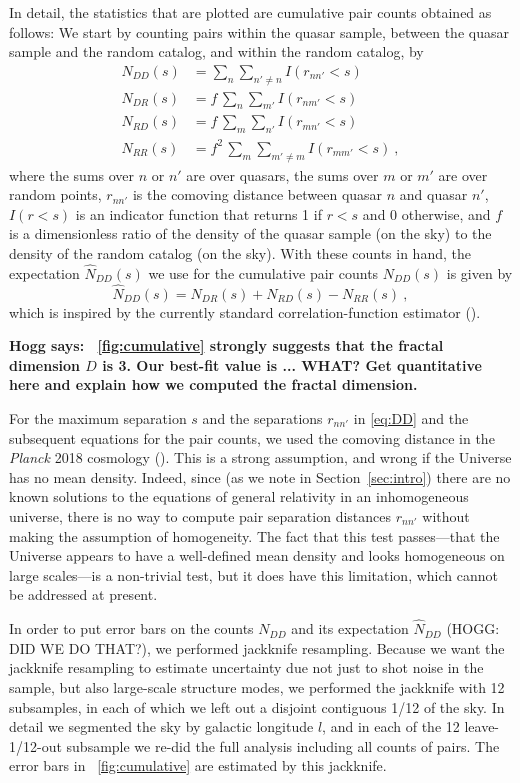 \documentclass[modern]{aastex631}
\newcommand{\sectionname}{Section}
\newcommand{\secref}[1]{\sectionname~\ref{#1}}
\newcommand{\figref}[1]{\figurename~\ref{#1}}
\newcommand{\hogg}[1]{\textbf{Hogg says: #1}}
\begin{document}
In detail, the statistics that are plotted are cumulative pair counts obtained as follows:
We start by counting pairs within the quasar sample, between the quasar sample and the random catalog, and within the random catalog, by
\begin{align}\label{eq:DD}
    N_{DD}(s) &= \sum_n \sum_{n'\ne n} I(r_{nn'} < s) \\
    N_{DR}(s) &= f\,\sum_n \sum_{m'} I(r_{nm'} < s) \\
    N_{RD}(s) &= f\,\sum_m \sum_{n'} I(r_{mn'} < s) \\
    N_{RR}(s) &= f^2\,\sum_m \sum_{m'\ne m} I(r_{mm'} < s)\label{eq:RR} ~,
\end{align}
where the sums over $n$ or $n'$ are over quasars,
the sums over $m$ or $m'$ are over random points,
$r_{nn'}$ is the comoving distance between quasar $n$ and quasar $n'$,
$I(r<s)$ is an indicator function that returns 1 if $r<s$ and 0 otherwise,
and $f$ is a dimensionless ratio of the density of the quasar sample (on the sky) to the density of the random catalog (on the sky).
With these counts in hand, the expectation $\hat{N}_{DD}(s)$ we use for the cumulative pair counts $N_{DD}(s)$ is given by
\begin{equation}\label{eq:DDhat}
    \hat{N}_{DD}(s) = N_{DR}(s) + N_{RD}(s) - N_{RR}(s) ~,
\end{equation}
which is inspired by the currently standard correlation-function estimator (\citealt{ls}).

\hogg{\figref{fig:cumulative} strongly suggests that the fractal dimension $D$ is 3.
Our best-fit value is ... WHAT?
Get quantitative here and explain how we computed the fractal dimension.}

For the maximum separation $s$ and the separations $r_{nn'}$ in \eqref{eq:DD} and the subsequent equations for the pair counts, we used the comoving distance in the \textsl{Planck} 2018 cosmology (\citealt{planck18}).
This is a strong assumption, and wrong if the Universe has no mean density.
Indeed, since (as we note in \secref{sec:intro}) there are no known solutions to the equations of general relativity in an inhomogeneous universe, there is no way to compute pair separation distances $r_{nn'}$ without making the assumption of homogeneity.
The fact that this test passes---that the Universe appears to have a well-defined mean density and looks homogeneous on large scales---is a non-trivial test, but it does have this limitation, which cannot be addressed at present.

In order to put error bars on the counts $N_{DD}$ and its expectation $\hat{N}_{DD}$ (HOGG: DID WE DO THAT?), we performed jackknife resampling.
Because we want the jackknife resampling to estimate uncertainty due not just to shot noise in the sample, but also large-scale structure modes, we performed the jackknife with 12 subsamples, in each of which we left out a disjoint contiguous 1/12 of the sky.
In detail we segmented the sky by galactic longitude $l$, and in each of the 12 leave-1/12-out subsample we re-did the full analysis including all counts of pairs.
The error bars in \figref{fig:cumulative} are estimated by this jackknife.
\end{document}
